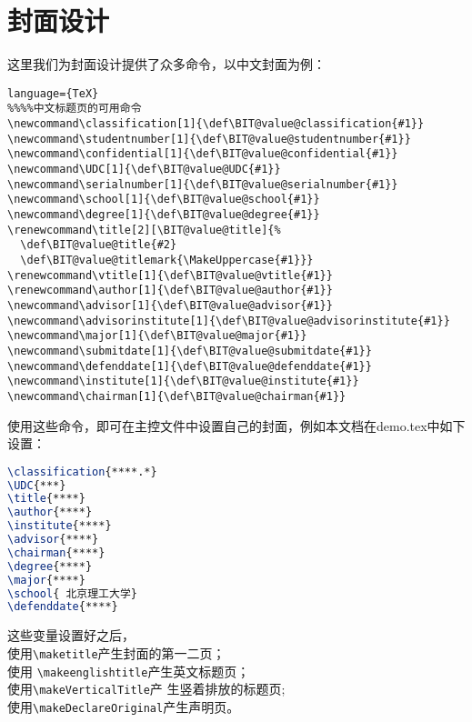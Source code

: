 \section{封面设计}
这里我们为封面设计提供了众多命令，以中文封面为例：
\begin{lstlisting}language={TeX}
%%%%中文标题页的可用命令
\newcommand\classification[1]{\def\BIT@value@classification{#1}}
\newcommand\studentnumber[1]{\def\BIT@value@studentnumber{#1}}
\newcommand\confidential[1]{\def\BIT@value@confidential{#1}}
\newcommand\UDC[1]{\def\BIT@value@UDC{#1}}
\newcommand\serialnumber[1]{\def\BIT@value@serialnumber{#1}}
\newcommand\school[1]{\def\BIT@value@school{#1}}
\newcommand\degree[1]{\def\BIT@value@degree{#1}}
\renewcommand\title[2][\BIT@value@title]{%
  \def\BIT@value@title{#2}
  \def\BIT@value@titlemark{\MakeUppercase{#1}}}
\renewcommand\vtitle[1]{\def\BIT@value@vtitle{#1}}
\renewcommand\author[1]{\def\BIT@value@author{#1}}
\newcommand\advisor[1]{\def\BIT@value@advisor{#1}}
\newcommand\advisorinstitute[1]{\def\BIT@value@advisorinstitute{#1}}
\newcommand\major[1]{\def\BIT@value@major{#1}}
\newcommand\submitdate[1]{\def\BIT@value@submitdate{#1}}
\newcommand\defenddate[1]{\def\BIT@value@defenddate{#1}}
\newcommand\institute[1]{\def\BIT@value@institute{#1}}
\newcommand\chairman[1]{\def\BIT@value@chairman{#1}}

\end{lstlisting}

使用这些命令，即可在主控文件中设置自己的封面，例如本文档在demo.tex中如下
设置：
\begin{lstlisting}[language={TeX}]
\classification{****.*}
\UDC{***}
\title{****}
\author{****}
\institute{****}
\advisor{****}
\chairman{****}
\degree{****}
\major{****}
\school{ 北京理工大学}
\defenddate{****}
\end{lstlisting}

这些变量设置好之后，\\使用\verb+\maketitle+产生封面的第一二页；\\使用
\verb+\makeenglishtitle+产生英文标题页；\\使用\verb+\makeVerticalTitle+产
生竖着排放的标题页;\\使用\verb+\makeDeclareOriginal+产生声明页。
